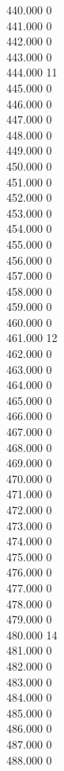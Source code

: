 { 440.000	0 \\
 441.000	0 \\
 442.000	0 \\
 443.000	0 \\
 444.000	11 \\
 445.000	0 \\
 446.000	0 \\
 447.000	0 \\
 448.000	0 \\
 449.000	0 \\
 450.000	0 \\
 451.000	0 \\
 452.000	0 \\
 453.000	0 \\
 454.000	0 \\
 455.000	0 \\
 456.000	0 \\
 457.000	0 \\
 458.000	0 \\
 459.000	0 \\
 460.000	0 \\
 461.000	12 \\
 462.000	0 \\
 463.000	0 \\
 464.000	0 \\
 465.000	0 \\
 466.000	0 \\
 467.000	0 \\
 468.000	0 \\
 469.000	0 \\
 470.000	0 \\
 471.000	0 \\
 472.000	0 \\
 473.000	0 \\
 474.000	0 \\
 475.000	0 \\
 476.000	0 \\
 477.000	0 \\
 478.000	0 \\
 479.000	0 \\
 480.000	14 \\
 481.000	0 \\
 482.000	0 \\
 483.000	0 \\
 484.000	0 \\
 485.000	0 \\
 486.000	0 \\
 487.000	0 \\
 488.000	0 \\
}
